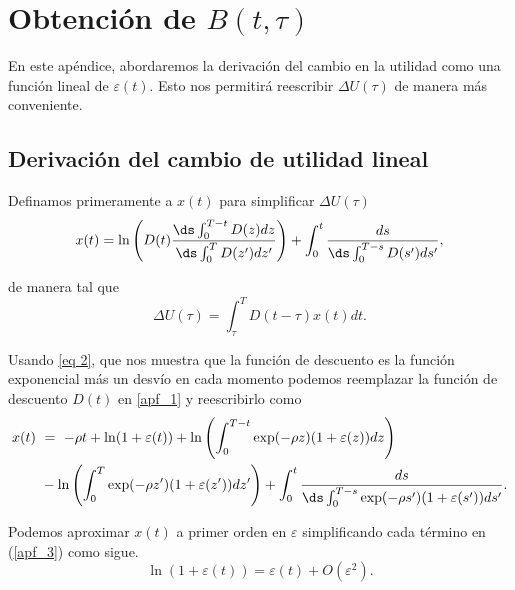 \chapter{Obtención de $B(t,\tau)$}\label{Apendice_F}

En este apéndice, abordaremos la derivación del cambio en la utilidad como una función lineal de $\varepsilon(t)$. Esto nos permitirá reescribir $\Delta U(\tau)$ de manera más conveniente.

\section{Derivación del cambio de utilidad lineal}
Definamos primeramente a $x(t)$ para simplificar $\Delta U(\tau)$
\begin{equation}
\label{apf_1}
    x(t)=\ln\left(D(t)\frac{\ds \int_{0}^{T-t}D(z)d z}{\ds \int_{0}^{T}D(z^{\prime})d z^{\prime}}\right)+\int_{0}^{t}\frac{d s}{\ds \int_{0}^{T-s}D(s^{\prime})d s^{\prime}},
\end{equation}

de manera tal que
\begin{equation}
    \label{apf_2}
    \Delta U(\tau)=\int_{\tau}^{T}D(t-\tau)x(t)d t.
\end{equation}

Usando \ref{eq 2}, que nos muestra que la función de descuento es la función exponencial más un desvío en cada momento podemos reemplazar la función de descuento $D(t)$ en \ref{apf_1} y reescribirlo como
\begin{equation}
\label{apf_3}
    \begin{split}
        x(t)~&=~-\rho t+\ln\!\left(1+\varepsilon(t)\right)+\ln\left(\int_{0}^{T-t}\exp(-\rho z)(1+\varepsilon(z))d z\right) \\
        &-\ln\left(\int_{0}^{T}\exp(-\rho z^{\prime})(1+\varepsilon(z^{\prime}))d z^{\prime}\right)+\int_{0}^{t}\frac{d s}{\ds \int_{0}^{T-s}\exp(-\rho s^{\prime})(1+\varepsilon(s^{\prime}))d s^{\prime}}.
    \end{split}
\end{equation}

Podemos aproximar $x(t)$ a primer orden en $\varepsilon$ simplificando cada término en (\ref{apf_3}) como sigue.
$$\ln(1+\varepsilon(t))=\varepsilon(t)+O(\varepsilon^{2}).$$

